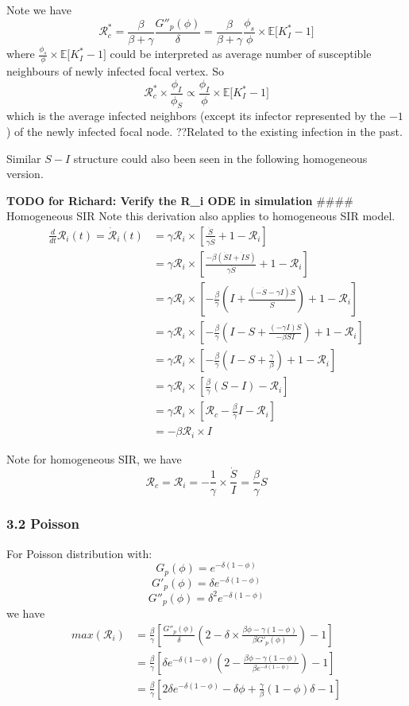\documentclass[
]{article}
\begin{document}
Note we have
\[\mathcal{R}^*_c=\frac{\beta}{\beta+\gamma}\frac{G''_p(\phi)}{\delta}=\frac{\beta}{\beta+\gamma}\frac{\phi_s}{\phi} \times \mathbb{E}\Big[ K^*_I-1\Big]\]
where \(\frac{\phi_s}{\phi} \times \mathbb{E}\Big[ K^*_I-1\Big]\) could
be interpreted as average number of susceptible neighbours of newly
infected focal vertex. So
\[\mathcal{R}^*_c \times \frac{\phi_I}{\phi_S}\propto \frac{\phi_I}{\phi}\times\mathbb{E}\Big[ K^*_I-1\Big]\]
which is the average infected neighbors (except its infector represented
by the \(-1\)) of the newly infected focal node. ??Related to the
existing infection in the past.

Similar \(S-I\) structure could also been seen in the following
homogeneous version.

\textbf{TODO for Richard: Verify the R\_i ODE in simulation} \#\#\#\#
Homogeneous SIR Note this derivation also applies to homogeneous SIR
model. \[\begin{aligned}
\frac{d}{dt}\mathcal{R}_i(t)=\dot{\mathcal{R}}_i(t) & =\gamma \mathcal{R}_i \times [\frac{\ddot{S}}{\gamma\dot{S}}+1-\mathcal{R}_i]
\\
& = \gamma \mathcal{R}_i \times [\frac{-\beta(\dot{S}I+\dot{I}S)}{\gamma\dot{S}}+1-\mathcal{R}_i]
\\
& = \gamma \mathcal{R}_i\times[-\frac{\beta}{\gamma}(I+\frac{(-\dot{S}-\gamma I)S}{\dot{S}})+1-\mathcal{R}_i]
\\
& = \gamma \mathcal{R}_i\times[-\frac{\beta}{\gamma}(I-S+\frac{(-\gamma I)S}{-\beta S I})+1-\mathcal{R}_i]
\\
& = \gamma \mathcal{R}_i\times[-\frac{\beta}{\gamma}(I-S+\frac{\gamma}{\beta})+1-\mathcal{R}_i]
\\
& =\gamma \mathcal{R}_i\times[\frac{\beta}{\gamma}(S-I)-\mathcal{R}_i]
\\
& =\gamma \mathcal{R}_i\times[\mathcal{R}_c-\frac{\beta}{\gamma}I-\mathcal{R}_i]
\\
& =-\beta \mathcal{R}_i\times I
\end{aligned}\]

Note for homogeneous SIR, we have
\[\mathcal{R}_c=\mathcal{R}_i=-\frac{1}{\gamma}\times\frac{\dot{S}}{I}=\frac{\beta}{\gamma}S\]

\subsubsection{3.2 Poisson}\label{poisson}

For Poisson distribution with: \[G_p(\phi)=e^{-\delta(1-\phi)}\]
\[G'_p(\phi)=\delta e^{-\delta(1-\phi)}\]
\[G''_p(\phi)=\delta^2 e^{-\delta(1-\phi)}\]we have \[\begin{aligned}
max(\mathcal{R}_{i}) & =\frac{\beta}{\gamma}[\frac{G''_p(\phi)}{\delta}(2-\delta\times\frac{\beta\phi-\gamma(1-\phi)}{\beta G'_p(\phi)})-1]
\\
& =\frac{\beta}{\gamma}[\delta e^{-\delta(1-\phi)}(2-\frac{\beta\phi-\gamma(1-\phi)}{\beta e^{-\delta(1-\phi)}})-1]
\\
& = \frac{\beta}{\gamma}[2\delta e^{-\delta(1-\phi)}-\delta\phi+\frac{\gamma}{\beta}(1-\phi)\delta-1] 
\end{aligned}\]
\end{document}
